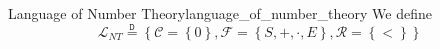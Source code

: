 \begin{definition}{Language of Number Theory}{language_of_number_theory}
We define
\[
    \mathcal{ L } _{ NT }  \stackrel{\mathtt{D}}{=} \left\{ \mathcal{ C } = \left\{ 0 \right\} , \mathcal{ F } =  \left\{ S, +, \cdot , E \right\} , \mathcal{ R } = \left\{ < \right\}     \right\} 
\]
\end{definition}
